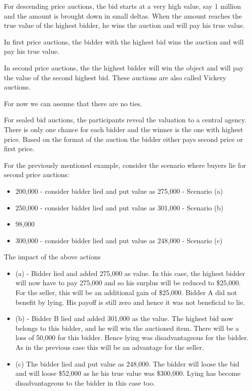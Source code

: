 \documentclass[twoside]{article}
\begin{document}
For descending price auctions, the bid starts at a very high value, say 1 million and the amount is brought down in small deltas. When the amount reaches the true value of the highest bidder, he wins the auction and will pay his true value.

In first price auctions, the bidder with the highest bid wins the auction and will pay his true value.

In second price auctions, the the highest bidder will win the object and will pay the value of the second highest bid. These auctions are also called Vickery auctions.

For now we can assume that there are no ties.

For sealed bid auctions, the participants reveal the valuation to a central agency. There is only one chance for each bidder and the winner is the one with highest price. Based on the format of the auction the bidder either pays second price or first price.

For the previously mentioned example, consider the scenario where buyers lie for second price auctions:
\begin{itemize}
  \item 200,000 -  consider bidder lied and put value as 275,000 - Scenario (a)
  \item 250,000 - consider bidder lied and put value as 301,000 - Scenario (b)
  \item 98,000
  \item 300,000 - consider bidder lied and put value as 248,000 - Scenario (c)
\end{itemize}

The impact of the above actions
\begin{itemize}
  \item (a) - Bidder lied and added 275,000 as value. In this case, the highest bidder will now have to pay 275,000 and so his surplus will be reduced to \$25,000. For the seller, this will be an additional gain of \$25,000. Bidder A did not benefit by lying. His payoff is still zero and hence it was not beneficial to lie.
  \item (b) - Bidder B lied and added 301,000 as the value. The highest bid now belongs to this bidder, and he will win the auctioned item. There will be a loss of 50,000 for this bidder. Hence lying was disadvantageous for the bidder. As in the previous case this will be an advantage for the seller.
  \item (c) The bidder lied and put value as 248,000. The bidder will loose the bid and will loose \$52,000 as he his true value was \$300,000. Lying has become disadvantageous to the bidder in this case too.
\end{itemize}
\end{document}
